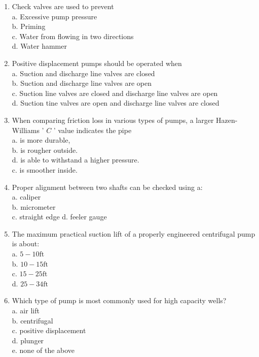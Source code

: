 \begin{enumerate}[1.]
\item Check valves are used to prevent\\
a. Excessive pump pressure\\
b. Priming\\
c. Water from flowing in two directions\\
d. Water hammer\\

\item Positive displacement pumps should be operated when\\
a. Suction and discharge line valves are closed\\
b.  Suction and discharge line valves are open\\
c. Suction line valves are closed and discharge line valves are open\\
d. Suction tine valves are open and discharge line valves are closed\\

\item When comparing friction loss in various types of pumps, a larger Hazen-Williams ' $C$ ' value indicates the pipe\\
a. is more durable,\\
b. is rougher outside.\\
d. is able to withstand a higher pressure.\\
c. is smoother inside.\\

\item Proper alignment between two shafts can be checked using a:\\
a. caliper\\
b. micrometer\\
c. straight edge
d. feeler gauge\\

\item The maximum practical suction lift of a properly engineered centrifugal pump is about:\\
a. $5-10 \mathrm{ft}$\\
b. $10-15 \mathrm{ft}$\\
c. $15-25 \mathrm{ft}$\\
d. $25-34 \mathrm{ft}$ \\

\item Which type of pump is most commonly used for high capacity wells?\\
a. air lift\\
b. centrifugal\\
c. positive displacement\\
d. plunger\\
e. none of the above\\


\end{enumerate}
